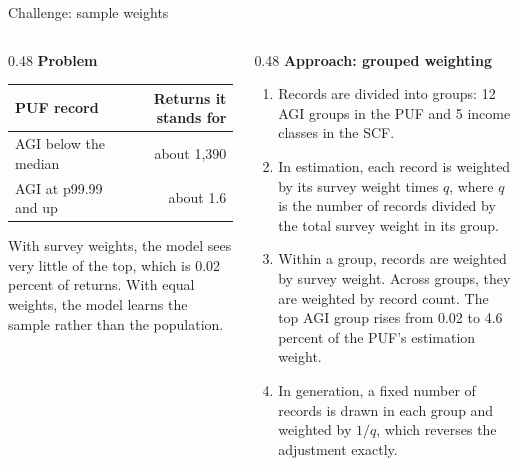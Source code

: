 \documentclass[11pt,aspectratio=169]{beamer}
\begin{document}
\begin{frame}{Challenge: sample weights}
  \begin{columns}[T]
    \begin{column}{0.48\textwidth}
      \textbf{\color{yaleblue}Problem}\\[0.4em]
      \small
      \begin{tabular}{@{}lr@{}}
        \toprule
        PUF record & Returns it stands for \\
        \midrule
        AGI below the median & about 1,390 \\
        AGI at p99.99 and up & about 1.6 \\
        \bottomrule
      \end{tabular}

      \vspace{0.8em}
      With survey weights, the model sees very little of the top, which is 0.02 percent of returns.
      With equal weights, the model learns the sample rather than the population.
    \end{column}
    \begin{column}{0.48\textwidth}
      \textbf{\color{yaleblue}Approach: grouped weighting}\\[0.4em]
      \footnotesize
      \begin{enumerate}
        \item Records are divided into groups: 12 AGI groups in the PUF and 5 income classes in the SCF.
        \item In estimation, each record is weighted by its survey weight times $q$, where $q$ is the
              number of records divided by the total survey weight in its group.
        \item Within a group, records are weighted by survey weight. Across groups, they are weighted by
              record count. The top AGI group rises from 0.02 to 4.6 percent of the PUF's estimation weight.
        \item In generation, a fixed number of records is drawn in each group and weighted by $1/q$,
              which reverses the adjustment exactly.
      \end{enumerate}
    \end{column}
  \end{columns}
\end{frame}
\end{document}
